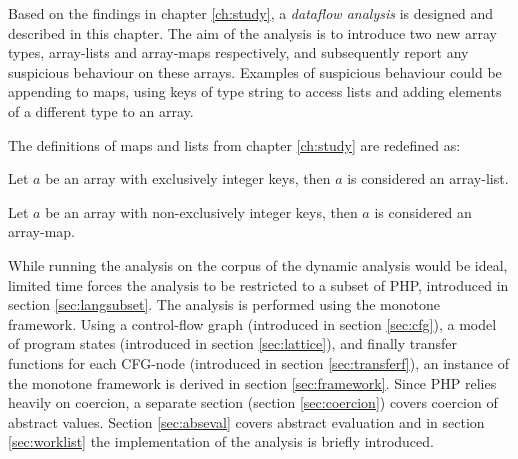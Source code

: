 Based on the findings in chapter \ref{ch:study}, a \emph{dataflow analysis} is designed and described in this chapter. The aim of the analysis is to introduce two new array types, array-lists and array-maps respectively, and subsequently report any suspicious behaviour on these arrays. Examples of suspicious behaviour could be appending to maps, using keys of type string to access lists and adding elements of a different type to an array.

The definitions of maps and lists from chapter \ref{ch:study} are redefined as:

\begin{definition}
Let $a$ be an array with exclusively integer keys, then $a$ is considered an array-list.
\label{def:newList}
\end{definition}

\begin{definition}
Let $a$ be an array with non-exclusively integer keys, then $a$ is considered an array-map.
\label{def:newMap}
\end{definition}

While running the analysis on the corpus of the dynamic analysis would be ideal, limited time forces the analysis to be restricted to a subset of PHP, introduced in section \ref{sec:langsubset}. The analysis is performed using the monotone framework. Using a control-flow graph (introduced in section \ref{sec:cfg}), a model of program states (introduced in section \ref{sec:lattice}), and finally transfer functions for each CFG-node (introduced in section \ref{sec:transferf}), an instance of the monotone framework is derived in section \ref{sec:framework}. Since PHP relies heavily on coercion, a separate section (section \ref{sec:coercion}) covers coercion of abstract values. Section \ref{sec:abseval} covers abstract evaluation and in section \ref{sec:worklist} the implementation of the analysis is briefly introduced.
